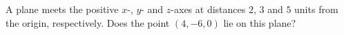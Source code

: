 A plane meets the positive $x$-, $y$- and $z$-axes at distances $2$, $3$ and $5$ units from the origin, respectively. Does the point $(4,-6,0)$ lie on this plane?
